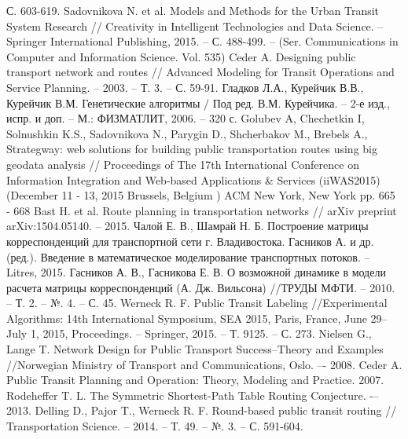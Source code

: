 \begin{thebibliography}{10}
        С. 603-619.
     Sadovnikova N. et al. Models and Methods for the Urban Transit System Research //
        Creativity in Intelligent Technologies and Data Science. -- Springer International Publishing, 
        2015. -- С. 488-499. -- (Ser. Communications in Computer and Information Science. Vol. 535)
     Ceder A. Designing public transport network and routes //
        Advanced Modeling for Transit Operations and Service Planning. -- 2003. -- Т. 3. -- С. 59-91.
     Гладков Л.А., Курейчик В.В., Курейчик В.М. Генетические алгоритмы / 
        Под ред. В.М. Курейчика. -- 2-е изд., испр. и доп. -- М.: ФИЗМАТЛИТ, 2006. -- 320 с.
     Golubev A, Chechetkin I, Solnushkin K.S., Sadovnikova N., Parygin D., Shcherbakov M., 
        Brebels A., Strategway: web solutions for building public transportation routes using big geodata 
        analysis // Proceedings of The 17th International Conference on Information Integration and 
        Web-based Applications \& Services (iiWAS2015) (December 11 - 13, 2015 Brussels, Belgium ) 
        ACM New York, New York pp. 665 - 668
     Bast H. et al. Route planning in transportation networks //
        arXiv preprint arXiv:1504.05140. -- 2015.
     Чалой Е. В., Шамрай Н. Б. Построение матрицы корреспонденций для транспортной 
        сети г. Владивостока. %
     Гасников А. и др. (ред.). Введение в математическое моделирование транспортных 
        потоков. -- Litres, 2015.
     Гасников А. В., Гасникова Е. В. О возможной динамике в модели расчета матрицы 
        корреспонденций (А. Дж. Вильсона) //ТРУДЫ МФТИ. -- 2010. -- Т. 2. -- №. 4. -- С. 45.
     Werneck R. F. Public Transit Labeling //Experimental Algorithms: 
        14th International Symposium, SEA 2015, Paris, France, June 29–July 1, 2015, 
        Proceedings. -- Springer, 2015. -- Т. 9125. -- С. 273.
     Nielsen G., Lange T. Network Design for Public Transport Success–Theory 
        and Examples //Norwegian Ministry of Transport and Communications, Oslo. –- 2008.
     Ceder A. Public Transit Planning and Operation: Theory, Modeling and Practice. 2007.
     Rodeheffer T. L. The Symmetric Shortest-Path Table Routing 
        Conjecture. -– 2013.
     Delling D., Pajor T., Werneck R. F. Round-based public transit routing //
        Transportation Science. -- 2014. -- Т. 49. -- №. 3. -- С. 591-604.

\end{thebibliography}
